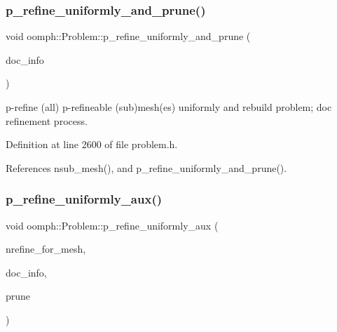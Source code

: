 \subsubsection{\texorpdfstring{p\+\_\+refine\+\_\+uniformly\+\_\+and\+\_\+prune()}{p\_refine\_uniformly\_and\_prune()}\hspace{0.1cm}{\footnotesize\ttfamily [3/3]}}
{\footnotesize\ttfamily void oomph\+::\+Problem\+::p\+\_\+refine\+\_\+uniformly\+\_\+and\+\_\+prune (\begin{DoxyParamCaption}\item[{\hyperlink{classoomph_1_1DocInfo}{Doc\+Info} \&}]{doc\+\_\+info }\end{DoxyParamCaption})\hspace{0.3cm}{\ttfamily [inline]}}



p-\/refine (all) p-\/refineable (sub)mesh(es) uniformly and rebuild problem; doc refinement process. 



Definition at line 2600 of file problem.\+h.



References nsub\+\_\+mesh(), and p\+\_\+refine\+\_\+uniformly\+\_\+and\+\_\+prune().

\mbox{\label{classoomph_1_1Problem_a9e598cc12a894db00bfe62d87a0ff41b}} 
\subsubsection{\texorpdfstring{p\+\_\+refine\+\_\+uniformly\+\_\+aux()}{p\_refine\_uniformly\_aux()}}
{\footnotesize\ttfamily void oomph\+::\+Problem\+::p\+\_\+refine\+\_\+uniformly\+\_\+aux (\begin{DoxyParamCaption}\item[{const \hyperlink{classoomph_1_1Vector}{Vector}$<$ unsigned $>$ \&}]{nrefine\+\_\+for\+\_\+mesh,  }\item[{\hyperlink{classoomph_1_1DocInfo}{Doc\+Info} \&}]{doc\+\_\+info,  }\item[{const bool \&}]{prune }\end{DoxyParamCaption})\hspace{0.3cm}{\ttfamily [private]}}



